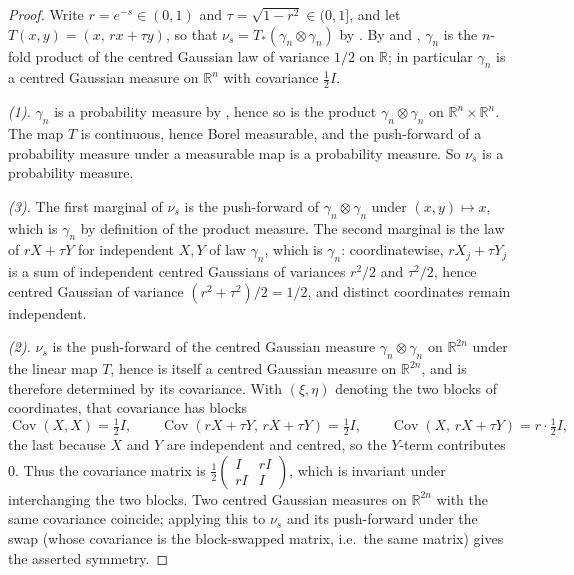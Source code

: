 \begin{proof}
Write $r = e^{-s} \in (0,1)$ and $\tau = \sqrt{1-r^2} \in (0,1]$, and let
$T(x,y) = (x,\, rx+\tau y)$, so that $\nu_s = T_*(\gamma_n\otimes\gamma_n)$ by
.  By  and ,
$\gamma_n$ is the $n$-fold product of the centred Gaussian law of variance $1/2$
on $\mathbb{R}$; in particular $\gamma_n$ is a centred Gaussian measure on
$\mathbb{R}^n$ with covariance $\tfrac12 I$.

\emph{(1).}
$\gamma_n$ is a probability measure by , hence so is the
product $\gamma_n \otimes \gamma_n$ on $\mathbb{R}^n\times\mathbb{R}^n$.  The map
$T$ is continuous, hence Borel measurable, and the push-forward of a probability
measure under a measurable map is a probability measure.  So $\nu_s$ is a
probability measure.

\emph{(3).}
The first marginal of $\nu_s$ is the push-forward of $\gamma_n\otimes\gamma_n$
under $(x,y)\mapsto x$, which is $\gamma_n$ by definition of the product measure.
The second marginal is the law of $rX + \tau Y$ for independent $X, Y$ of law
$\gamma_n$, which is $\gamma_n$: coordinatewise, $rX_j + \tau Y_j$ is a sum of
independent centred Gaussians of variances $r^2/2$ and $\tau^2/2$, hence centred
Gaussian of variance $(r^2+\tau^2)/2 = 1/2$, and distinct coordinates remain
independent.

\emph{(2).}
$\nu_s$ is the push-forward of the centred Gaussian measure
$\gamma_n\otimes\gamma_n$ on $\mathbb{R}^{2n}$ under the linear map $T$, hence is
itself a centred Gaussian measure on $\mathbb{R}^{2n}$, and is therefore
determined by its covariance.  With $(\xi,\eta)$ denoting the two blocks of
coordinates, that covariance has blocks
\[
  \operatorname{Cov}(X, X) = \tfrac12 I,
  \qquad
  \operatorname{Cov}(rX+\tau Y,\, rX + \tau Y) = \tfrac12 I,
  \qquad
  \operatorname{Cov}(X,\, rX+\tau Y) = r\cdot\tfrac12 I,
\]
the last because $X$ and $Y$ are independent and centred, so the $Y$-term
contributes $0$.  Thus the covariance matrix is
$\tfrac12\begin{pmatrix} I & rI\\ rI & I\end{pmatrix}$, which is invariant under
interchanging the two blocks.  Two centred Gaussian measures on
$\mathbb{R}^{2n}$ with the same covariance coincide; applying this to $\nu_s$ and
its push-forward under the swap (whose covariance is the block-swapped matrix,
i.e.\ the same matrix) gives the asserted symmetry.


\end{proof}
